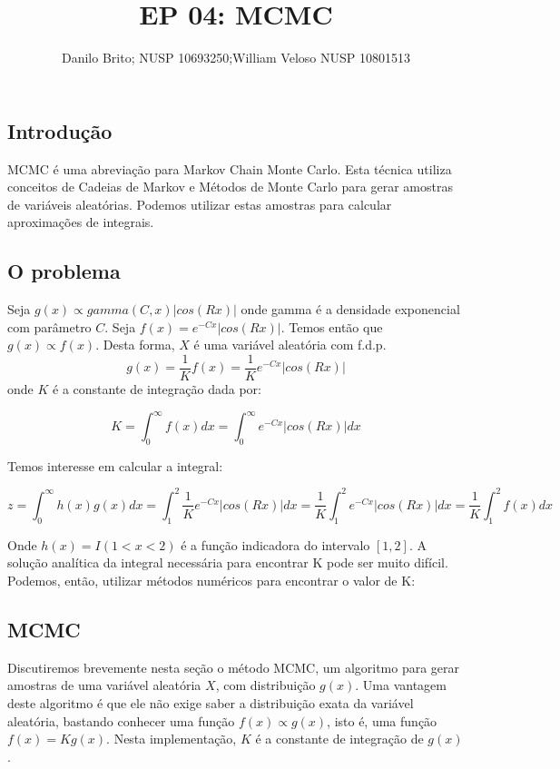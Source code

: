 \documentclass[]{article}
\title{EP 04: MCMC}
\author{Danilo Brito; NUSP 10693250;William Veloso NUSP 10801513}
\date{}
\begin{document}
\maketitle

\hypertarget{introducao}{%
\subsection{Introdução}\label{introducao}}

MCMC é uma abreviação para Markov Chain Monte Carlo. Esta técnica
utiliza conceitos de Cadeias de Markov e Métodos de Monte Carlo para
gerar amostras de variáveis aleatórias. Podemos utilizar estas amostras
para calcular aproximações de integrais.

\hypertarget{o-problema}{%
\subsection{O problema}\label{o-problema}}

Seja \(g(x)\propto gamma(C,x)|cos(Rx)|\) onde gamma é a densidade
exponencial com parâmetro \(C\). Seja \(f(x)=e^{-Cx}|cos(Rx)|\). Temos
então que \(g(x)\propto f(x)\). Desta forma, \(X\) é uma variável
aleatória com f.d.p.
\[g(x)=\frac{1}{K}f(x)=\frac{1}{K}e^{-Cx}|cos(Rx)|\] onde \(K\) é a
constante de integração dada por:

\[K=\int_{0}^{\infty}f(x)dx=\int_{0}^{\infty}e^{-Cx}|cos(Rx)|dx\]

Temos interesse em calcular a integral:

\[z=\int_{0}^{\infty}h(x)g(x)dx=\int_{1}^{2}\frac{1}{K}e^{-Cx}|cos(Rx)|dx=\frac{1}{K}\int_{1}^{2}e^{-Cx}|cos(Rx)|dx=\frac{1}{K}\int_{1}^{2}f(x)dx\]

Onde \(h(x)=I(1<x<2)\) é a função indicadora do intervalo \([1,2]\). A
solução analítica da integral necessária para encontrar K pode ser muito
difícil. Podemos, então, utilizar métodos numéricos para encontrar o
valor de K:


\hypertarget{mcmc}{%
\subsection{MCMC}\label{mcmc}}

Discutiremos brevemente nesta seção o método MCMC, um algoritmo para
gerar amostras de uma variável aleatória \(X\), com distribuição
\(g(x)\). Uma vantagem deste algoritmo é que ele não exige saber a
distribuição exata da variável aleatória, bastando conhecer uma função
\(f(x)\propto g(x)\), isto é, uma função \(f(x)=Kg(x)\). Nesta
implementação, \(K\) é a constante de integração de \(g(x)\).
\end{document}
